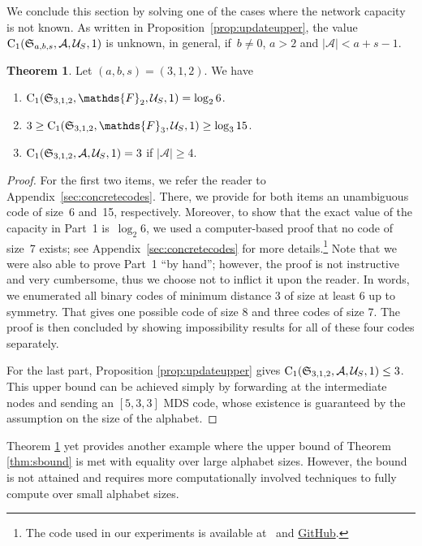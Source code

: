\documentclass[11pt,a4paper]{article}
\theoremstyle{definition}
\newtheorem{theorem}{Theorem}[section]
\newcommand{\numberset}{\mathds}
\newcommand{\F}{\numberset{F}}
\newcommand{\mA}{\mathcal{A}}
\newcommand{\mU}{\mathcal{U}}
\newcommand{\CC}{\textnormal{C}}
\begin{document}
We conclude this section by solving one of the cases where the network capacity is not known. As written in Proposition~\ref{prop:updateupper}, the value $\CC_1(\mathfrak{S}_{a,b,s},\mA,\mU_S,1)$ is unknown, in general, if~$b \neq 0$, $a>2$ and $|\mA| < a+s-1.$


\begin{theorem}
\label{thm:another_interesting_ex}
Let $(a,b,s)=(3,1,2)$. We have 
\begin{enumerate}
    \item $\CC_1(\mathfrak{S}_{3,1,2},\F_2,\mU_S,1) = \log_2 6$.
    \item $3 \ge \CC_1(\mathfrak{S}_{3,1,2},\F_3,\mU_S,1) \ge \log_3 15$.
    \item $\CC_1(\mathfrak{S}_{3,1,2},\mA,\mU_S,1) = 3$ if $\lvert \mA \rvert \ge 4$.
\end{enumerate}
\end{theorem}
\begin{proof}
For the first two items, we refer the reader to Appendix~\ref{sec:concretecodes}.
There, we provide for both items an unambiguous code of size~6 and~15, respectively.
Moreover, to show that the exact value of the capacity in Part~1 is~$\log_2 6$, we used a computer-based proof that no code of size~7 exists; see Appendix~\ref{sec:concretecodes} for more details.\footnote{The code used in our experiments is available at~\cite{zenodo} and \href{https://github.com/christopherhojny/supplement_network_codes}{GitHub}.} Note that we were also able to prove Part~1 ``by hand''; however, the proof is not instructive and very cumbersome, thus we choose not to inflict it upon the reader. In words, we enumerated all binary codes of minimum distance 3 of size at least 6 up to symmetry. That gives one possible code of size 8 and three codes of size 7. The proof is then concluded by showing impossibility results for all of these four codes separately. 

For the last part, Proposition \ref{prop:updateupper} gives $\CC_1(\mathfrak{S}_{3,1,2},\mA,\mU_S,1) \le 3$. This upper bound can be achieved simply by forwarding at the intermediate nodes and sending an $[5,3,3]$ MDS code, whose existence is guaranteed by the assumption on the size of the alphabet.
\end{proof}

Theorem \ref{thm:another_interesting_ex} yet provides another example where the upper bound of Theorem \ref{thm:sbound} is met with equality over large alphabet sizes. However, the bound is not attained and requires more computationally involved techniques to fully compute over small alphabet sizes. 
\end{document}
